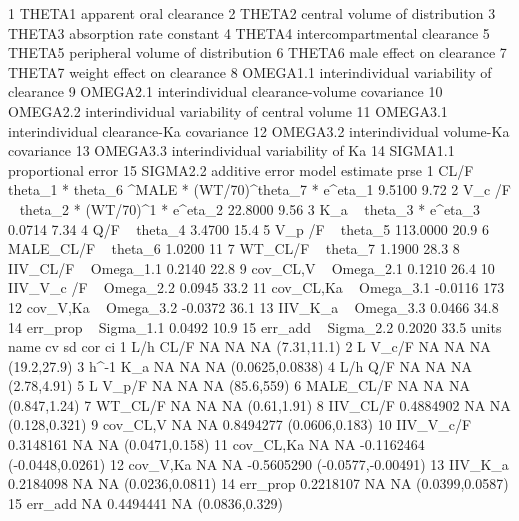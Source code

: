 \begin{Schunk}
\begin{Soutput}
1     THETA1                       apparent oral clearance
2     THETA2                central volume of distribution
3     THETA3                      absorption rate constant
4     THETA4                  intercompartmental clearance
5     THETA5             peripheral volume of distribution
6     THETA6                      male effect on clearance
7     THETA7                    weight effect on clearance
8   OMEGA1.1      interindividual variability of clearance
9   OMEGA2.1   interindividual clearance-volume covariance
10  OMEGA2.2 interindividual variability of central volume
11  OMEGA3.1       interindividual clearance-Ka covariance
12  OMEGA3.2          interindividual volume-Ka covariance
13  OMEGA3.3             interindividual variability of Ka
14  SIGMA1.1                            proportional error
15  SIGMA2.2                                additive error
                                                           model estimate prse
1  CL/F  ~ theta_1 *  theta_6 ^MALE * (WT/70)^theta_7  * e^eta_1   9.5100 9.72
2                        V_c /F  ~ theta_2 * (WT/70)^1 * e^eta_2  22.8000 9.56
3                                       K_a  ~ theta_3 * e^eta_3   0.0714 7.34
4                                                 Q/F  ~ theta_4   3.4700 15.4
5                                              V_p /F  ~ theta_5 113.0000 20.9
6                                            MALE_CL/F ~ theta_6   1.0200   11
7                                              WT_CL/F ~ theta_7   1.1900 28.3
8                                           IIV_CL/F ~ Omega_1.1   0.2140 22.8
9                                           cov_CL,V ~ Omega_2.1   0.1210 26.4
10                                        IIV_V_c /F ~ Omega_2.2   0.0945 33.2
11                                        cov_CL,Ka  ~ Omega_3.1  -0.0116  173
12                                         cov_V,Ka  ~ Omega_3.2  -0.0372 36.1
13                                          IIV_K_a  ~ Omega_3.3   0.0466 34.8
14                                          err_prop ~ Sigma_1.1   0.0492 10.9
15                                           err_add ~ Sigma_2.2   0.2020 33.5
   units      name        cv        sd        cor                 ci
1    L/h      CL/F        NA        NA         NA        (7.31,11.1)
2      L     V_c/F        NA        NA         NA        (19.2,27.9)
3  h^-1        K_a        NA        NA         NA    (0.0625,0.0838)
4    L/h       Q/F        NA        NA         NA        (2.78,4.91)
5      L     V_p/F        NA        NA         NA         (85.6,559)
6        MALE_CL/F        NA        NA         NA       (0.847,1.24)
7          WT_CL/F        NA        NA         NA        (0.61,1.91)
8         IIV_CL/F 0.4884902        NA         NA      (0.128,0.321)
9         cov_CL,V        NA        NA  0.8494277     (0.0606,0.183)
10       IIV_V_c/F 0.3148161        NA         NA     (0.0471,0.158)
11       cov_CL,Ka        NA        NA -0.1162464   (-0.0448,0.0261)
12        cov_V,Ka        NA        NA -0.5605290 (-0.0577,-0.00491)
13         IIV_K_a 0.2184098        NA         NA    (0.0236,0.0811)
14        err_prop 0.2218107        NA         NA    (0.0399,0.0587)
15         err_add        NA 0.4494441         NA     (0.0836,0.329)
\end{Soutput}
\end{Schunk}
